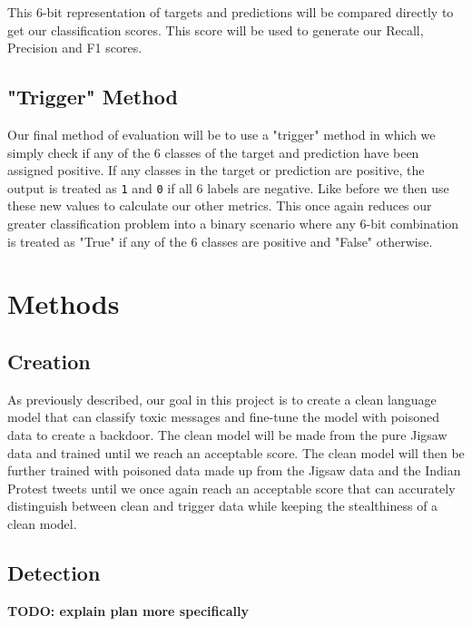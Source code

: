 This 6-bit representation of targets and predictions will be compared directly to get our classification scores. This score will be used to generate our Recall, Precision and F1 scores.

\subsection{"Trigger" Method}

Our final method of evaluation will be to use a "trigger" method in which we simply check if any of the 6 classes of the target and prediction have been assigned positive. If any classes in the target or prediction are positive, the output is treated as \verb|1| and \verb|0| if all 6 labels are negative. Like before we then use these new values to calculate our other metrics. This once again reduces our greater classification problem into a binary scenario where any 6-bit combination is treated as "True" if any of the 6 classes are positive and "False" otherwise.

\section{Methods}

\subsection{Creation}

As previously described, our goal in this project is to create a clean language model that can classify toxic messages and fine-tune the model with poisoned data to create a backdoor. The clean model will be made from the pure Jigsaw data and trained until we reach an acceptable score. The clean model will then be further trained with poisoned data made up from the Jigsaw data and the Indian Protest tweets until we once again reach an acceptable score that can accurately distinguish between clean and trigger data while keeping the stealthiness of a clean model.

\subsection{Detection}






\textbf{TODO: explain plan more specifically}